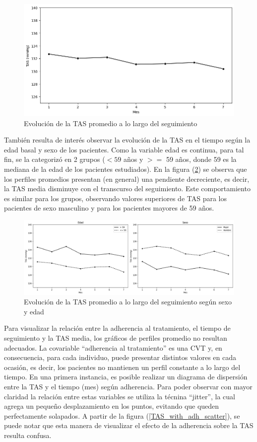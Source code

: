 \documentclass[spanish]{article}
\numberwithin{figure}{subsection}
\numberwithin{equation}{subsection}
\numberwithin{table}{subsection}
\begin{document}
\begin{figure}[H]
	\centering
	\includegraphics[scale=0.5]{img/TAS_vs_tpo.png}
	\caption{Evolución de la TAS promedio a lo largo del seguimiento}
	\label{TAS_vs_tpo}
\end{figure}

También resulta de interés observar la evolución de la TAS en el tiempo según la
edad basal y sexo de los pacientes. Como la variable edad es continua, para tal
fin, se la categorizó en 2 grupos ($< 59$ años y $>=$ 59 años, donde 59 es la
mediana de la edad de los pacientes estudiados). En la figura
(\ref{TAS_with_covs}) se observa que los perfiles promedios presentan (en
general) una pendiente decreciente, es decir, la TAS media disminuye con el
transcurso del seguimiento. Este comportamiento es similar para los grupos,
observando valores superiores de TAS para los pacientes de sexo masculino y para
los pacientes mayores de 59 años. 

\begin{figure}[H]
	\centering
	\includegraphics[scale=0.4]{img/TAS_vs_tpo_with_covs.png}
	\caption{Evolución de la TAS promedio a lo largo del seguimiento según sexo y edad}
	\label{TAS_with_covs}
\end{figure}

Para visualizar la relación entre la adherencia al tratamiento, el tiempo de
seguimiento y la TAS media, los gráficos de perfiles promedio no resultan
adecuados. La covariable ``adherencia al tratamiento'' es una CVT y, en
consecuencia, para cada individuo, puede presentar distintos valores en cada
ocasión, es decir, los pacientes no mantienen un perfil constante a lo largo del
tiempo. En una primera instancia, es posible realizar un diagrama de dispersión
entre la TAS y el tiempo (mes) según adherencia. Para poder observar con mayor
claridad la relación entre estas variables se utiliza la técnina ``jitter'', la
cual agrega un pequeño desplazamiento en los puntos, evitando que queden
perfectamente solapados. A partir de la figura (\ref{TAS_with_adh_scatter}), se
puede notar que esta manera de visualizar el efecto de la adherencia sobre la
TAS resulta confusa.
\end{document}
